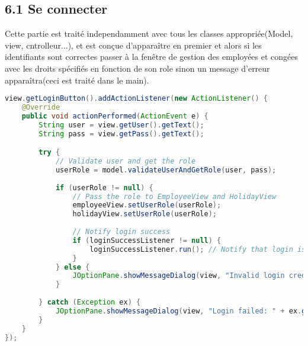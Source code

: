 \documentclass[a4paper,12pt]{report}
\begin{document}
\subsection{\textcolor{mygreen}{6.1 Se connecter}}
Cette partie est traité independamment avec tous les classes appropriée(Model, view, cntrolleur...), et est conçue d'apparaître en premier et alors
si les identifiants sont correctes passer à la fenêtre de gestion des employées et congées avec les droits spécifiés en fonction de son role sinon un message d'erreur apparaîtra(ceci est traité dans le main).
\begin{lstlisting}[language=java, caption={Le processus declenché après la validation des identifiants par l'utilisateur}]
view.getLoginButton().addActionListener(new ActionListener() {
    @Override
    public void actionPerformed(ActionEvent e) {
        String user = view.getUser().getText();
        String pass = view.getPass().getText();

        try {
            // Validate user and get the role
            userRole = model.validateUserAndGetRole(user, pass);
            
            if (userRole != null) {
                // Pass the role to EmployeeView and HolidayView
                employeeView.setUserRole(userRole);
                holidayView.setUserRole(userRole);
                
                // Notify login success
                if (loginSuccessListener != null) {
                    loginSuccessListener.run(); // Notify that login is successful
                }
            } else {
                JOptionPane.showMessageDialog(view, "Invalid login credentials!", "Error", JOptionPane.ERROR_MESSAGE);
            }
            
        } catch (Exception ex) {
            JOptionPane.showMessageDialog(view, "Login failed: " + ex.getMessage(), "Error", JOptionPane.ERROR_MESSAGE);
        }
    }
});
\end{lstlisting}
\end{document}
